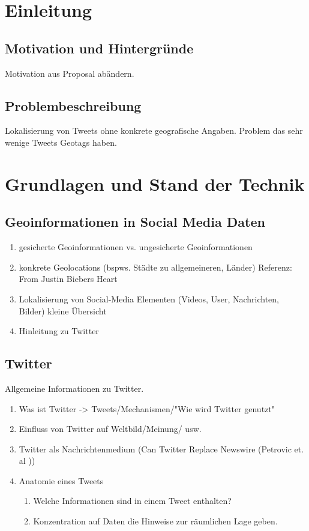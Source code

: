 \chapter{Einleitung}

\section{Motivation und Hintergründe}
Motivation aus Proposal abändern.

\section{Problembeschreibung} Lokalisierung von Tweets ohne konkrete geografische Angaben. Problem
das sehr wenige Tweets Geotags haben.

\chapter{Grundlagen und Stand der Technik}
	\section{Geoinformationen in Social Media Daten}
 		\begin{enumerate}
 			\item {} gesicherte Geoinformationen vs. ungesicherte Geoinformationen
 			\item konkrete Geolocations (bspws. Städte zu allgemeineren, Länder) Referenz: From Justin Biebers Heart 
 			\item Lokalisierung von Social-Media Elementen (Videos, User, Nachrichten, Bilder) kleine Übersicht
 			\item Hinleitung zu Twitter  
 		\end{enumerate}

	\section{Twitter}
		Allgemeine Informationen zu Twitter. 
		\begin{enumerate}
			\item Was ist Twitter -> Tweets/Mechanismen/"Wie wird Twitter genutzt"
			\item {} Einfluss von Twitter auf Weltbild/Meinung/ usw.
			\item Twitter als Nachrichtenmedium (Can Twitter Replace Newswire (Petrovic et. al ))
			\item Anatomie eines Tweets 
				\begin{enumerate}
					\item Welche Informationen sind in einem Tweet enthalten? 
					\item Konzentration auf Daten die Hinweise zur räumlichen Lage geben.
				\end{enumerate}
		\end{enumerate}
		
